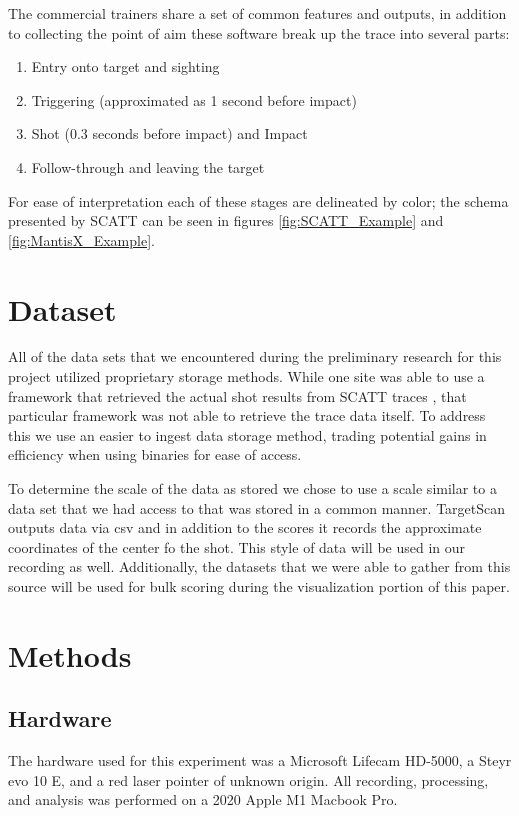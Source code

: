 \documentclass[conference]{IEEEtran}
\begin{document}
The commercial trainers share a set of common features and outputs,
in addition to collecting the point of aim these software break up the trace into several parts:
\begin{enumerate}
	\item Entry onto target and sighting
	\item Triggering (approximated as 1 second before impact)
	\item Shot (0.3 seconds before impact)  and Impact
	\item Follow-through and leaving the target
\end{enumerate}
For ease of interpretation each of these stages are delineated by color; the schema presented by SCATT can be seen in figures 
\ref{fig:SCATT_Example} and
\ref{fig:MantisX_Example}.


\section{Dataset}

All of the data sets that we encountered during the preliminary research for this project utilized proprietary storage methods.
While one site was able to use a framework that retrieved the actual shot results from SCATT traces \cite{scatt-db}, that particular framework was not able to retrieve the trace data itself.
To address this we use an easier to ingest data storage method, trading potential gains in efficiency when using binaries for ease of access.

To determine the scale of the data as stored we chose to use a scale similar to a data set that we had access to that was stored in a common manner.
TargetScan \cite{targetscan} outputs data via csv and in addition to the scores it records the approximate coordinates of the center fo the shot. 
This style of data will be used in our recording as well.
Additionally, the datasets that we were able to gather from this source will be used for bulk scoring during the visualization portion of this paper.


\section{Methods}

\subsection{Hardware}

The hardware used for this experiment was 
a Microsoft Lifecam HD-5000,
a Steyr evo 10 E,
and a red laser pointer of unknown origin.
All recording, processing, and analysis was performed on 
a 2020 Apple M1 Macbook Pro.
\end{document}
